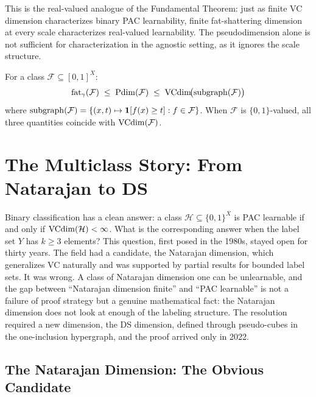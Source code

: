 This is the real-valued analogue of the Fundamental Theorem: just as finite VC
dimension characterizes binary PAC learnability, finite fat-shattering
dimension at every scale characterizes real-valued learnability.  The
pseudodimension alone is not sufficient for characterization in the agnostic
setting, as it ignores the scale structure.

\begin{remark}
For a class $\mathcal{F} \subseteq [0,1]^X$:
\[
  \mathrm{fat}_\gamma(\mathcal{F})
  \;\leq\; \mathrm{Pdim}(\mathcal{F})
  \;\leq\; \mathrm{VCdim}\!\bigl(\mathrm{subgraph}(\mathcal{F})\bigr)
\]
where $\mathrm{subgraph}(\mathcal{F}) = \{(x,t) \mapsto \mathbf{1}[f(x) \geq t] :
f \in \mathcal{F}\}$.  When $\mathcal{F}$ is $\{0,1\}$-valued, all three
quantities coincide with $\mathrm{VCdim}(\mathcal{F})$.
\end{remark}



\section{The Multiclass Story: From Natarajan to DS}
\label{sec:multiclass}

Binary classification has a clean answer: a class $\mathcal{H} \subseteq
\{0,1\}^X$ is PAC learnable if and only if $\mathrm{VCdim}(\mathcal{H}) < \infty$.
What is the corresponding answer when the label set $Y$ has $k \geq 3$
elements?  This question, first posed in the 1980s, stayed open for thirty
years.  The field had a candidate, the Natarajan dimension, which
generalizes VC naturally and was supported by partial results for bounded
label sets.  It was wrong.  A class of Natarajan dimension one can be
unlearnable, and the gap between ``Natarajan dimension finite'' and
``PAC learnable'' is not a failure of proof strategy but a genuine
mathematical fact: the Natarajan dimension does not look at enough of
the labeling structure.  The resolution required a new dimension, the DS
dimension, defined through pseudo-cubes in the one-inclusion hypergraph,
and the proof arrived only in 2022.


\subsection{The Natarajan Dimension: The Obvious Candidate}

